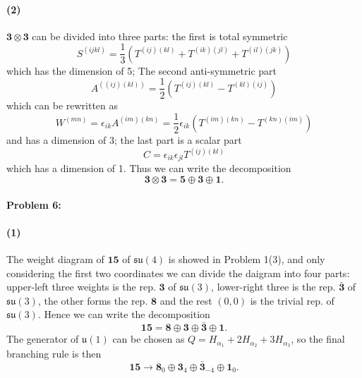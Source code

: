\documentclass[12pt]{article}
\begin{document}
\paragraph{(2)}
$\boldsymbol{3} \otimes \boldsymbol{3}$ can be divided into three parts: the first is total symmetric
\begin{equation*}
  S^{(ijkl)} = \frac{1}{3} (T^{(ij)(kl)} + T^{(ik)(jl)} + T^{(il)(jk)})
\end{equation*}
which has the dimension of 5; 
The second anti-symmetric part
\begin{equation*}
  A^{((ij)(kl))} = \frac{1}{2} (T^{(ij)(kl)} - T^{(kl)(ij)})
\end{equation*}
which can be rewritten as
\begin{equation*}
  W^{(mn)} = \epsilon_{ik} A^{(im)(kn)} = \frac{1}{2} \epsilon_{ik} (T^{(im)(kn)} - T^{(kn)(im)})
\end{equation*}
and has a dimension of 3;
the last part is a scalar part
\begin{equation*}
  C = \epsilon_{ik} \epsilon_{jl} T^{(ij)(kl)}
\end{equation*}
which has a dimension of 1.
Thus we can write the decomposition
\begin{equation*}
  \boldsymbol{3} \otimes \boldsymbol{3} = \boldsymbol{5} \oplus \boldsymbol{3} \oplus \boldsymbol{1}.
\end{equation*}

\paragraph{Problem 6:}
\paragraph{(1)}
The weight diagram of $\boldsymbol{15}$ of $\mathfrak{su}(4)$ is showed in Problem 1(3), and only considering the first two coordinates we can divide the daigram into four parts:
upper-left three weights is the rep. $\boldsymbol{3}$ of $\mathfrak{su}(3)$, lower-right three is the rep. $\bar{\boldsymbol{3}}$ of $\mathfrak{su}(3)$, the other forms the rep. $\boldsymbol{8}$ and the rest $(0, 0)$ is the trivial rep. of $\mathfrak{su}(3)$.
Hence we can write the decomposition
\begin{equation*}
  \boldsymbol{15} = \boldsymbol{8} \oplus \boldsymbol{3} \oplus \bar{\boldsymbol{3}} \oplus \boldsymbol{1}.
\end{equation*}
The generator of $\mathfrak{u}(1)$ can be chosen as $Q = H_{\alpha_1} + 2H_{\alpha_2} + 3H_{\alpha_3}$, so the final branching rule is then
\begin{equation*}
  \boldsymbol{15} \rightarrow \boldsymbol{8}_{0} \oplus \boldsymbol{3}_{4} \oplus \bar{\boldsymbol{3}}_{-4} \oplus \boldsymbol{1}_{0}.
\end{equation*}
\end{document}
